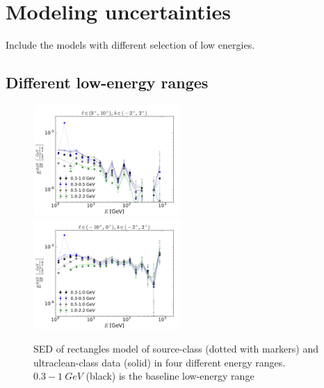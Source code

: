 \section{Modeling uncertainties}

Include the models with different selection of low energies.
\subsection{Different low-energy ranges}

\begin{figure}[h]
\includegraphics[width=0.5\textwidth]{plots/SED_different_lowE_ranges_boxes_l=5_b=0.pdf}
\includegraphics[width=0.5\textwidth]{plots/SED_different_lowE_ranges_boxes_l=-5_b=0.pdf}
  	\caption{SED of rectangles model of source-class (dotted with markers) and ultraclean-class data (solid) in four different energy ranges. $0.3 - \SI{1}{GeV}$ (black) is the baseline low-energy range}
  	\label{fig:Profiles}
\end{figure}